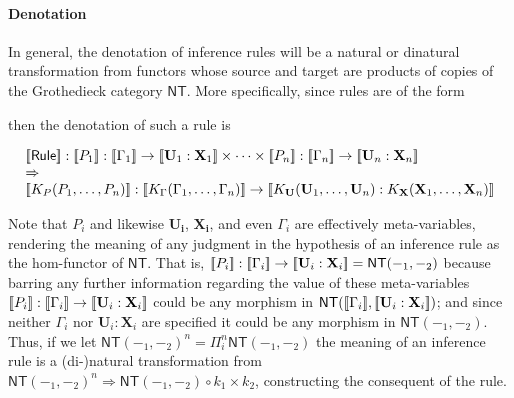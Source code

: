 \paragraph{Denotation}
In general, the denotation of inference rules will be a natural or dinatural transformation from functors whose source and target are products of copies of the Grothedieck category $\mathsf{NT}$. More specifically, since rules are of the form

\begin{mathpar}
\end{mathpar}

then the denotation of such a rule is

$$\begin{array}{l}
  \meaningof{\mathsf{Rule}} : \meaningof{P_{1}} : \meaningof{\Gamma_{1}} \to \meaningof{\mathbf{U}_{1} : \mathbf{X}_{1}} \times \cdots \times \meaningof{P_{n}} : \meaningof{\Gamma_{n}} \to \meaningof{\mathbf{U}_{n} : \mathbf{X}_{n}} \\\Rightarrow\\ \meaningof{K_{P}(P_{1},\ldots,P_{n})} : \meaningof{K_{\Gamma}(\Gamma_{1},\ldots,\Gamma_{n})} \to \meaningof{K_{\mathbf{U}}(\mathbf{U}_{1},\ldots,\mathbf{U}_{n}) : K_{\mathbf{X}}(\mathbf{X}_{1},\ldots,\mathbf{X}_{n})}
\end{array}$$

Note that $P_{i}$ and likewise $\mathbf{U_{i}}$, $\mathbf{X_{i}}$, and
even $\Gamma_{i}$ are effectively meta-variables, rendering the
meaning of any judgment in the hypothesis of an inference rule as the
hom-functor of $\mathsf{NT}$. That is, $\meaningof{P_{i}} : \meaningof{\Gamma_{i}} \to \meaningof{\mathbf{U}_{i} : \mathbf{X}_{i}} = \mathsf{NT}(-_{1},-_{2})$ because barring any further information regarding the value of these meta-variables $\meaningof{P_{i}} : \meaningof{\Gamma_{i}} \to \meaningof{\mathbf{U}_{i} : \mathbf{X}_{i}}$ could be any morphism in $\mathsf{NT}(\meaningof{\Gamma_{i}},\meaningof{\mathbf{U}_{i} : \mathbf{X}_{i}})$; and since neither $\Gamma_{i}$ nor $\mathbf{U}_{i} : \mathbf{X}_{i}$ are specified it could be any morphism in $\mathsf{NT}(-_{1},-_{2})$. Thus, if we let $\mathsf{NT}(-_{1}, -_{2})^n = \Pi_{i}^{n}\mathsf{NT}(-_{1}, -_{2})$ the meaning of an inference rule is a (di-)natural transformation from $\mathsf{NT}(-_{1}, -_{2})^{n} \Rightarrow \mathsf{NT}(-_{1}, -_{2}) \circ k_{1} \times k_{2}$, constructing the consequent of the rule.


